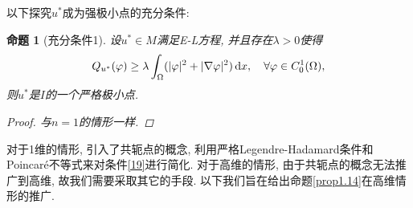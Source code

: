 \documentclass[12pt,a4paper]{article}
\newtheorem{proposition}[theorem]{命题}
\begin{document}
以下探究$u^*$成为强极小点的充分条件:

\begin{proposition}[充分条件1]
    设$u^* \in M$满足E-L方程, 并且存在$\lambda > 0$使得 
    \begin{equation}\label{19}
        Q_{u^*}(\varphi) \geq \lambda\int_{\Omega}(|\varphi|^2 + |\nabla\varphi|^2) \,{\rm d}x, \quad \forall \varphi \in C_0^1(\Omega),
    \end{equation}
    则$u^*$是$I$的一个严格极小点.
    \begin{proof}
        与$n = 1$的情形一样.
    \end{proof}
\end{proposition}

对于1维的情形, 引入了共轭点的概念, 利用严格Legendre-Hadamard条件和Poincaré不等式来对条件\eqref{19}进行简化.
对于高维的情形, 由于共轭点的概念无法推广到高维, 故我们需要采取其它的手段. 以下我们旨在给出命题\ref{prop1.14}在高维情形的推广.
\end{document}
